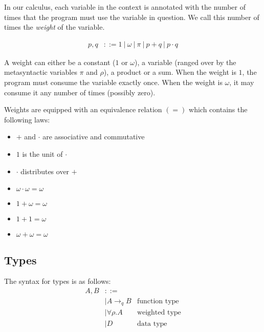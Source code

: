 \documentclass[11pt]{article}
\begin{document}
In our calculus, each variable in the context is annotated with the
number of times that the program must use the variable in question.
We call this number of times the \emph{weight} of the variable.

\begin{align*}
  p,q &::= 1 ~|~ ω ~|~ π ~|~ p+q ~|~ p·q
\end{align*}

A weight can either be a constant ($1$ or $ω$), a variable (ranged
over by the metasyntactic variables \(π\) and \(ρ\)), a product or a
sum.  When the weight is $1$, the program must consume the variable
exactly once. When the weight is $ω$, it may consume it any number of
times (possibly zero).

Weights are equipped with an equivalence relation $(=)$ which contains
the following laws:

\begin{itemize}
\item $+$ and $·$ are associative and commutative
\item $1$ is the unit of $·$
\item $·$ distributes over $+$
\item $ω · ω = ω$
\item $1 + ω = ω$
\item $1 + 1 = ω$
\item $ω + ω = ω$
\end{itemize}

\subsection{Types}
\label{sec:orgheadline2}

The syntax for types is as follows:
\begin{align*}
  A,B &::=\\
      & |  A →_q B &\text{function type}\\
      & |  ∀ρ. A &\text{weighted type}\\
      & |  D &\text{data type}
\end{align*}
\end{document}
